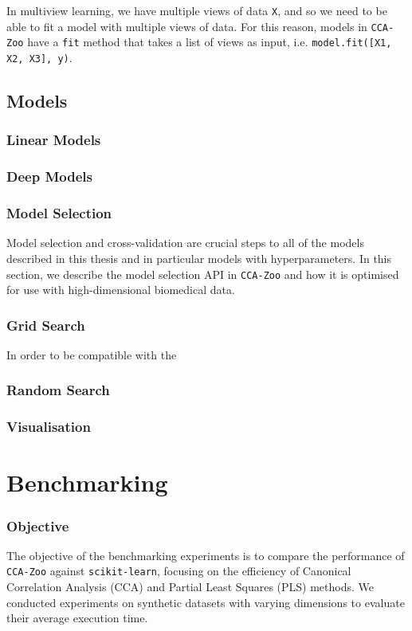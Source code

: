 In multiview learning, we have multiple views of data \texttt{X}, and so we need to be able to fit a model with multiple views of data.
For this reason, models in \texttt{CCA-Zoo} have a \texttt{fit} method that takes a list of views as input, i.e. \texttt{model.fit([X1, X2, X3], y)}.

\subsection{Models}

\subsubsection{Linear Models}

\subsubsection{Deep Models}


\subsubsection{Model Selection}

Model selection and cross-validation are crucial steps to all of the models described in this thesis and in particular models with hyperparameters.
In this section, we describe the model selection API in \texttt{CCA-Zoo} and how it is optimised for use with high-dimensional biomedical data.

\subsubsection{Grid Search}

In order to be compatible with the

\subsubsection{Random Search}

\subsubsection{Visualisation}

\section{Benchmarking}

\subsubsection{Objective}
The objective of the benchmarking experiments is to compare the performance of \texttt{CCA-Zoo} against \texttt{scikit-learn}, focusing on the efficiency of Canonical Correlation Analysis (CCA) and Partial Least Squares (PLS) methods.
We conducted experiments on synthetic datasets with varying dimensions to evaluate their average execution time.

